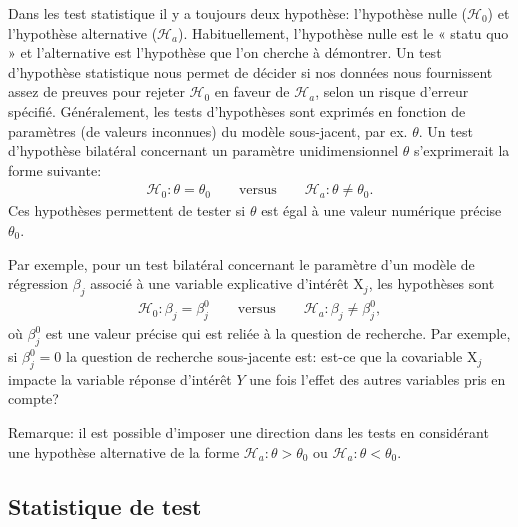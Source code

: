 \documentclass[
  11pt,
  letterpaper,
]{book}
\theoremstyle{definition}
\theoremstyle{definition}
\theoremstyle{definition}
\theoremstyle{remark}
\begin{document}
Dans les test statistique il y a toujours deux hypothèse: l'hypothèse nulle (\(\mathscr{H}_{0}\)) et l'hypothèse alternative (\(\mathscr{H}_a\)). Habituellement, l'hypothèse nulle est le « statu quo » et l'alternative est l'hypothèse que l'on cherche à démontrer. Un test d'hypothèse statistique nous permet de décider si nos données nous fournissent assez de preuves pour rejeter \(\mathscr{H}_0\) en faveur de \(\mathscr{H}_a\), selon un risque d'erreur spécifié. Généralement, les tests d'hypothèses sont exprimés en fonction de paramètres (de valeurs inconnues) du modèle sous-jacent, par ex. \(\theta\). Un test d'hypothèse bilatéral concernant un paramètre unidimensionnel \(\theta\) s'exprimerait la forme suivante:
\begin{align*}
\mathscr{H}_0: \theta=\theta_0 \qquad \text{versus} \qquad \mathscr{H}_a:\theta \neq \theta_0.
\end{align*}
Ces hypothèses permettent de tester si \(\theta\) est égal à une valeur numérique précise \(\theta_0\).

Par exemple, pour un test bilatéral concernant le paramètre d'un modèle de régression \(\beta_j\) associé à une variable explicative d'intérêt \(\mathrm{X}_j\), les hypothèses sont
\begin{align*}
\mathscr{H}_0: \beta_j=\beta_j^0 \qquad \text{versus} \qquad \mathscr{H}_a:\beta_j \neq \beta_j^0, 
\end{align*}
où \(\beta_j^0\) est une valeur précise qui est reliée à la question de recherche. Par exemple, si \(\beta_j^0=0\) la question de recherche sous-jacente est: est-ce que la covariable \(\mathrm{X}_j\) impacte la variable réponse d'intérêt \(Y\) une fois l'effet des autres variables pris en compte?

Remarque: il est possible d'imposer une direction dans les tests en considérant une hypothèse alternative de la forme \(\mathscr{H}_a: \theta > \theta_0\) ou \(\mathscr{H}_a: \theta < \theta_0\).

\hypertarget{statistique-de-test}{%
\subsection{Statistique de test}\label{statistique-de-test}}
\end{document}
